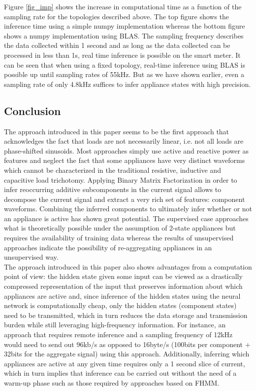 Figure \ref{fig_imp} shows the increase in computational time as a function of the sampling rate for the topologies described above. The top figure shows the inference time using a simple numpy implementation whereas the bottom figure shows a numpy implementation using BLAS. The sampling frequency describes the data collected within 1 second and as long as the data collected can be processed in less than 1s, real time inference is possible on the smart meter. It can be seen that when using a fixed topology, real-time inference using BLAS is possible up until sampling rates of 55kHz. But as we have shown earlier, even a sampling rate of only 4.8kHz suffices to infer appliance states with high precision.\\

\subsection{Conclusion}
The approach introduced in this paper seems to be the first approach that acknowledges the fact that loads are not necessarily linear, i.e. not all loads are phase-shifted sinusoids. Most approaches simply use active and reactive power as features and neglect the fact that some appliances have very distinct waveforms which cannot be characterized in the traditional resistive, inductive and capacitive load trichotomy. Applying Binary Matrix Factorization in order to infer reoccurring additive subcomponents in the current signal allows to decompose the current signal and extract a very rich set of features: component waveforms. Combining the inferred components to ultimately infer whether or not an appliance is active has shown great potential. The supervised case approaches what is theoretically possible under the assumption of 2-state appliances but requires the availability of training data whereas the results of unsupervised approaches indicate the possibility of re-aggregating appliances in an unsupervised way.\\ The approach introduced in this paper also shows advantages from a computation point of view: the hidden state given some input can be viewed as a drastically compressed representation of the input that preserves information about which appliances are active and, since inference of the hidden states using the neural network is computationally cheap, only the hidden states (component states) need to be transmitted, which in turn reduces the data storage and transmission burden while still leveraging high-frequency information. For instance, an approach that requires remote inference and a sampling frequency of 12kHz would need to send out 96kb/s as opposed to 16byte/s (100bits per component + 32bits for the aggregate signal) using this approach. Additionally, inferring which appliances are active at any given time requires only a 1 second slice of current, which in turn implies that inference can be carried out without the need of a warm-up phase such as those required by approaches based on FHMM.


